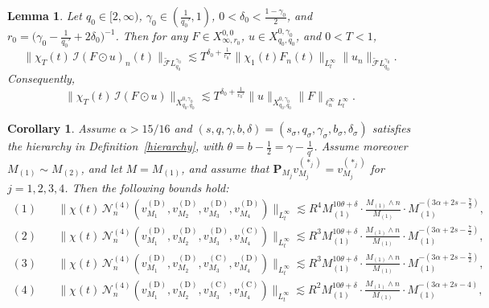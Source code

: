 \documentclass[10pt,a4paper]{amsart}
\newtheorem{lemma}{Lemma}
\newtheorem{corollary}{Corollary}
\newcommand{\dotcirc}{\mathbin{\odot}}
\begin{document}
\begin{lemma}\label{lem:N4mapping}
	Let $q_0\in[2,\infty)$, $\gamma_0\in(\frac{1}{q_0'},1)$, $0<\delta_0<\frac{1-\gamma_0}{2}$, and $r_0=\big(\gamma_0-\frac{1}{q_0'}+2\delta_0\big)^{-1}$. Then for any $F\in X_{\infty,r_0}^{0,0}$, $u\in X_{q_0,q_0}^{0,\gamma_0}$, and $0<T<1$,
	\[
	\|\chi_T(t)\,\mathcal{I}(F\dotcirc u)_n(t)\|_{\widetilde{\mathcal{F}}L_{q_0}^{\gamma_0}}
	\lesssim
	T^{\delta_0+\frac{1}{r_0'}}\|\chi_1(t)F_n(t)\|_{L_t^{\infty}}\|u_n\|_{\widetilde{\mathcal{F}}L_{q_0}^{\gamma_0}}.
	\]
	Consequently,
	\[
	\|\chi_T(t)\,\mathcal{I}(F\dotcirc u)\|_{X_{q_0,q_0}^{0,\gamma_0}}
	\lesssim
	T^{\delta_0+\frac{1}{r_0'}} \|u\|_{X_{q_0,q_0}^{0,\gamma_0}}\|F\|_{\ell_n^{\infty}L_t^{\infty}}.
	\]
\end{lemma}

\begin{corollary}\label{cor:4-linear-1}
	Assume $\alpha>15/16$ and $(s,q,\gamma,b,\delta)=(s_{\sigma},q_{\sigma},\gamma_{\sigma},b_{\sigma},\delta_{\sigma})$ satisfies the hierarchy in Definition~\ref{hierarchy}, with $\theta=b-\frac{1}{2}=\gamma-\frac{1}{q'}$. Assume moreover $M_{(1)}\sim M_{(2)}$, and let $M=M_{(1)}$, and assume that $\mathbf{P}_{M_j}v_{M_j}^{(\ast_j)}=v_{M_j}^{(\ast_j)}$ for $j=1,2,3,4$.
	Then the following bounds hold:
	\begin{align*}
		\mathrm{(1)} \quad &
		\|\chi(t)\,\mathcal{N}_n^{(4)}(v^{(\mathrm{D})}_{M_1},v^{(\mathrm{D})}_{M_2},v^{(\mathrm{D})}_{M_3},v^{(\mathrm{D})}_{M_4})\|_{L_t^{\infty}}
		\lesssim
		R^4 M_{(1)}^{10\theta+\delta}\cdot
		\frac{M_{(1)}\wedge n}{M_{(1)}}\cdot M_{(1)}^{-(3\alpha+2s-\frac{7}{2})},\\
		\mathrm{(2)} \quad &
		\|\chi(t)\,\mathcal{N}_n^{(4)}(v^{(\mathrm{D})}_{M_1},v^{(\mathrm{D})}_{M_2},v^{(\mathrm{D})}_{M_3},v^{(\mathrm{C})}_{M_4})\|_{L_t^{\infty}}
		\lesssim
		R^3 M_{(1)}^{10\theta+\delta}\cdot
		\frac{M_{(1)}\wedge n}{M_{(1)}}\cdot M_{(1)}^{-(3\alpha+2s-\frac72)},\\
		\mathrm{(3)} \quad &
		\|\chi(t)\,\mathcal{N}_n^{(4)}(v^{(\mathrm{D})}_{M_1},v^{(\mathrm{D})}_{M_2},v^{(\mathrm{C})}_{M_3},v^{(\mathrm{D})}_{M_4})\|_{L_t^{\infty}}
		\lesssim
		R^3 M_{(1)}^{10\theta+\delta}\cdot
		\frac{M_{(1)}\wedge n}{M_{(1)}}\cdot M_{(1)}^{-(3\alpha+2s-\frac72)},\\
		\mathrm{(4)} \quad &
		\|\chi(t)\,\mathcal{N}_n^{(4)}(v^{(\mathrm{D})}_{M_1},v^{(\mathrm{D})}_{M_2},v^{(\mathrm{C})}_{M_3},v^{(\mathrm{C})}_{M_4})\|_{L_t^{\infty}}
		\lesssim
		R^2 M_{(1)}^{10\theta+\delta}\cdot
		\frac{M_{(1)}\wedge n}{M_{(1)}}\cdot M_{(1)}^{-(3\alpha+2s-4)},\\

\end{align*}
\end{corollary}
\end{document}
